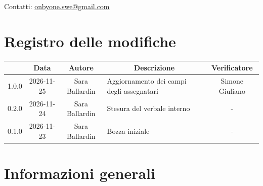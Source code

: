 \documentclass[11pt, a4paper]{article}
\begin{document}
\begin{titlepage}
    \vspace{0.5cm}
    
    {\large Contatti: \href{mailto:onbyone.swe@gmail.com}{onbyone.swe@gmail.com} }
    
\end{titlepage}

\newpage

\section*{Registro delle modifiche}

\vspace{1cm}
\begin{center}
    \renewcommand{\arraystretch}{1.5}
    \begin{tabularx}{\textwidth}{|c|c|c|X|c|}
        \hline
        \rowcolor{gray!10} 
        \multicolumn{1}{|c|}{\textbf{Versione}} & 
        \multicolumn{1}{c|}{\textbf{Data}} & 
        \multicolumn{1}{c|}{\textbf{Autore}} & 
        \multicolumn{1}{c|}{\textbf{Descrizione}} & 
        \multicolumn{1}{c|}{\textbf{Verificatore}} \\
        \hline
        1.0.0 & 2026-11-25 & Sara Ballardin & Aggiornamento dei campi degli assegnatari & Simone Giuliano \\
        \hline
        0.2.0 & 2026-11-24 & Sara Ballardin & Stesura del verbale interno & - \\
        \hline
        0.1.0 & 2026-11-23 & Sara Ballardin & Bozza iniziale & - \\
        \hline
    \end{tabularx}
\end{center}
\vfill
\newpage

\tableofcontents
\newpage

\section{Informazioni generali}
\end{document}
